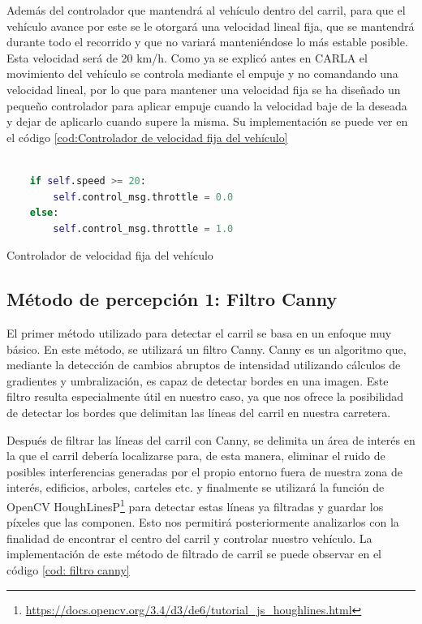 \bigskip

Además del controlador que mantendrá al vehículo dentro del carril, para que el vehículo avance por este se le otorgará una velocidad lineal fija, que se mantendrá durante todo el recorrido y que no variará manteniéndose lo más estable posible. Esta velocidad será de 20 km/h. Como ya se explicó antes en CARLA el movimiento del vehículo se controla mediante el empuje y no comandando una velocidad lineal, por lo que para mantener una velocidad fija se ha diseñado un pequeño controlador para aplicar empuje cuando la velocidad baje de la deseada y dejar de aplicarlo cuando supere la misma. Su implementación se puede ver en el código \ref{cod:Controlador de velocidad fija del vehículo}

\begin{code}[H]
	\begin{lstlisting}[language=Python]
	
	if self.speed >= 20:
		self.control_msg.throttle = 0.0            
	else:
		self.control_msg.throttle = 1.0    
	\end{lstlisting}
\caption[Controlador de velocidad fija del vehículo]{Controlador de velocidad fija del vehículo}
\label{cod:Controlador de velocidad fija del vehículo}
\end{code}


\subsection{Método de percepción 1: Filtro Canny}
\label{Método 1: Filtro Canny}

El primer método utilizado para detectar el carril se basa en un enfoque muy básico. En este método, se utilizará un filtro Canny. Canny es un algoritmo que, mediante la detección de cambios abruptos de intensidad utilizando cálculos de gradientes y umbralización, es capaz de detectar bordes en una imagen. Este filtro resulta especialmente útil en nuestro caso, ya que nos ofrece la posibilidad de detectar los bordes que delimitan las líneas del carril en nuestra carretera.

\bigskip

Después de filtrar las líneas del carril con Canny, se delimita un área de interés en la que el carril debería localizarse para, de esta manera, eliminar el ruido de posibles interferencias generadas por el propio entorno fuera de nuestra zona de interés, edificios, arboles, carteles etc. y finalmente se utilizará la función de OpenCV HoughLinesP\footnote{\url{https://docs.opencv.org/3.4/d3/de6/tutorial_js_houghlines.html}} para detectar estas líneas ya filtradas y guardar los píxeles que las componen. Esto nos permitirá posteriormente analizarlos con la finalidad de encontrar el centro del carril y controlar nuestro vehículo. La  implementación de este método de filtrado de carril se puede observar en el código \ref{cod: filtro canny}

